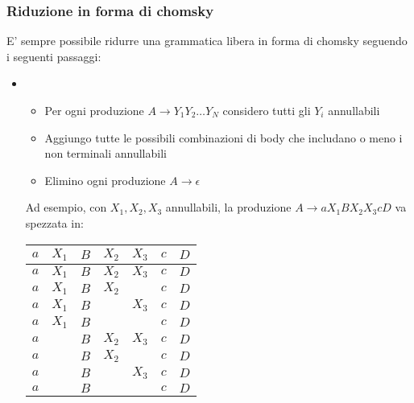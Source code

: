 \subsubsection{Riduzione in forma di chomsky}
E' sempre possibile ridurre una grammatica libera in forma di chomsky seguendo i seguenti passaggi:
\begin{itemize}
	\item {}
	      \begin{itemize}
		      \item Per ogni produzione $ A \rightarrow Y_1 Y_2 \ldots Y_N $ considero tutti gli $ Y_i $ annullabili
		      \item Aggiungo tutte le possibili combinazioni di body che includano o meno i non terminali annullabili
		      \item Elimino ogni produzione $ A \rightarrow \epsilon $
	      \end{itemize}
	      Ad esempio, con $ X_1, X_2, X_3 $ annullabili, la produzione $ A \rightarrow aX_1BX_2X_3cD $ va spezzata in:
	      \begin{center}
		      \begin{tabular}{c c c c c c c}
			      \toprule
			      $a$   & $X_1$   & $B$   & $X_2$   & $X_3$ & $c$ & $D$ \\
			      \midrule
			      $ a $ & $ X_1 $ & $ B $ & $ X_2 $ & $X_3$ & $c$ & $D$ \\
			      $ a $ & $ X_1 $ & $ B $ & $ X_2 $ &       & $c$ & $D$ \\
			      $ a $ & $ X_1 $ & $ B $ &         & $X_3$ & $c$ & $D$ \\
			      $ a $ & $ X_1 $ & $ B $ &         &       & $c$ & $D$ \\
			      $ a $ &         & $ B $ & $ X_2 $ & $X_3$ & $c$ & $D$ \\
			      $ a $ &         & $ B $ & $ X_2 $ &       & $c$ & $D$ \\
			      $ a $ &         & $ B $ &         & $X_3$ & $c$ & $D$ \\
			      $ a $ &         & $ B $ &         &       & $c$ & $D$ \\


\end{tabular}
\end{center}
\end{itemize}
